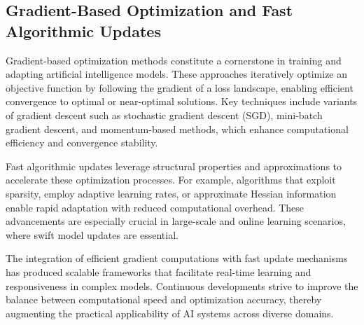 \documentclass[sigconf]{acmart}
\begin{document}
\subsection{Gradient-Based Optimization and Fast Algorithmic Updates}

Gradient-based optimization methods constitute a cornerstone in training and adapting artificial intelligence models. These approaches iteratively optimize an objective function by following the gradient of a loss landscape, enabling efficient convergence to optimal or near-optimal solutions. Key techniques include variants of gradient descent such as stochastic gradient descent (SGD), mini-batch gradient descent, and momentum-based methods, which enhance computational efficiency and convergence stability.

Fast algorithmic updates leverage structural properties and approximations to accelerate these optimization processes. For example, algorithms that exploit sparsity, employ adaptive learning rates, or approximate Hessian information enable rapid adaptation with reduced computational overhead. These advancements are especially crucial in large-scale and online learning scenarios, where swift model updates are essential.

The integration of efficient gradient computations with fast update mechanisms has produced scalable frameworks that facilitate real-time learning and responsiveness in complex models. Continuous developments strive to improve the balance between computational speed and optimization accuracy, thereby augmenting the practical applicability of AI systems across diverse domains.
\end{document}
